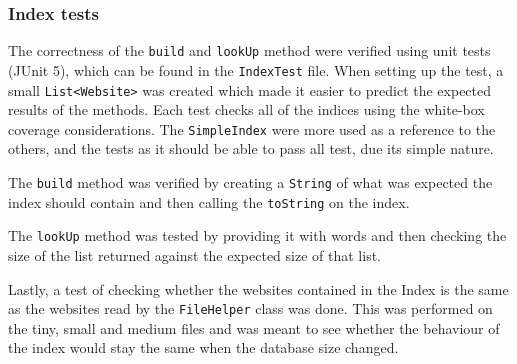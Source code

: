 \subsubsection{Index tests}
The correctness of the {\tt build} and {\tt lookUp} method were verified using unit tests (JUnit 5), which can be found in the {\tt IndexTest} file.
When setting up the test, a small {\tt List<Website>} was created which made it easier to predict the expected results of the methods. Each test
checks all of the indices using the white-box coverage considerations. The {\tt SimpleIndex} were more used as a reference to the others, and the
tests as it should be able to pass all test, due its simple nature.

The {\tt build} method was verified by creating a {\tt String} of what was expected the index should contain and then calling the {\tt toString} on
the index.

The {\tt lookUp} method was tested by providing it with words and then checking the size of the list returned against the expected size of that list.

Lastly, a test of checking whether the websites contained in the Index is the same as the websites read by the {\tt FileHelper} class was done.
This was performed on the tiny, small and medium files and was meant to see whether the behaviour of the index would stay the same when the
database size changed.


